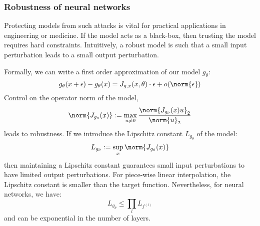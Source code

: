 \subsubsection{Robustness of neural networks}
Protecting models from such attacks is vital for practical applications in engineering or medicine. If the model acts as a black-box, then trusting the model requires hard constraints. Intuitively, a robust model is such that a small input perturbation leads to a small output perturbation.

Formally, we can write a first order approximation of our model $g_\theta$:
\begin{equation*}
    g_\theta(x+\epsilon)-g_\theta(x) = J_{g,x}(x,\theta)\cdot\epsilon+o(\norm{\epsilon})
\end{equation*}
Control on the operator norm of the model,
\begin{equation*}
    \norm{J_{g_\theta}(x)} := \max_{u\neq0}\frac{\norm{J_{g_\theta}(x)u}_2}{\norm{u}_2}
\end{equation*}
leads to robustness. If we introduce the Lipschitz constant $L_{g_\theta}$ of the model:
\begin{equation*}
    L_{g_\theta} := \sup_x \norm{J_{g_\theta}(x)}
\end{equation*}
then maintaining a  Lipschitz constant guarantees small input perturbations to have limited output perturbations. For piece-wise linear interpolation, the Lipschitz constant is smaller than the target function. Nevertheless, for neural networks, we have:
\begin{equation*}
    L_{g_\theta} \leq\prod_lL_{f^{(l)}}
\end{equation*}
and can be exponential in the number of layers.

\newpage